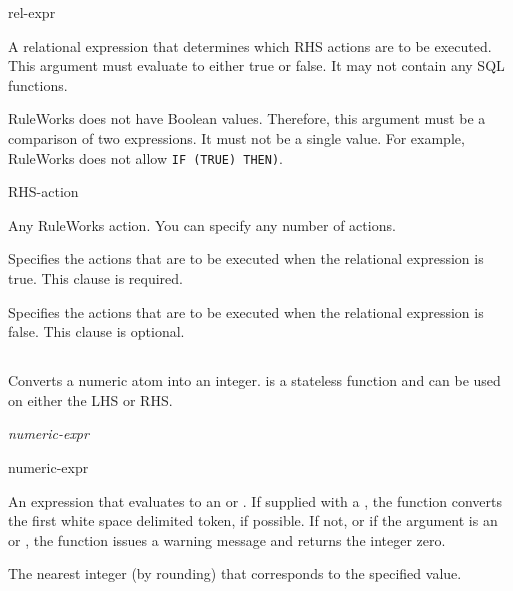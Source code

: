 \begin{arguments}
\item[rel-expr]

  A relational expression that determines which RHS actions are to be
  executed. This argument must evaluate to either true or false. It
  may not contain any SQL functions.
  \begin{note}
    RuleWorks does not have Boolean values. Therefore, this argument
    must be a comparison of two expressions. It must not be a single
    value. For example, RuleWorks does not allow
    \verb|IF (TRUE) THEN)|.
  \end{note}

\item[RHS-action]

  Any RuleWorks action. You can specify any number of actions.
\end{arguments}

\Clauses


Specifies the actions that are to be executed when the
relational expression is true. This clause is required.


Specifies the actions that are to be executed when the
relational expression is false. This clause is optional.

\subsection{}

Converts a numeric atom into an integer.  is a stateless
function and can be used on either the LHS or RHS.

\Format

 \it{numeric-expr}

\begin{argument}
\item[numeric-expr]

  An expression that evaluates to an  or . If
  supplied with a , the  function converts the
  first white space delimited token, if possible. If not, or if the
  argument is an  or , the function issues
  a warning message and returns the integer zero.
\end{argument}

\ReturnValue

The nearest integer (by rounding) that corresponds to the
specified value.

